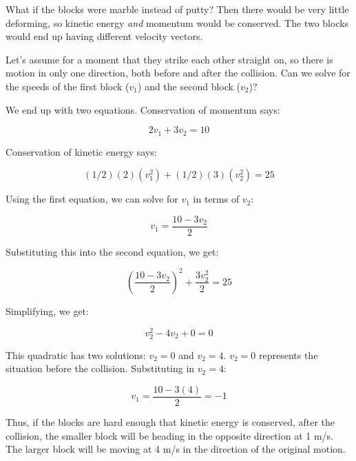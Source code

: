 What if the blocks were marble instead of putty?  Then there would be
very little deforming, so kinetic energy \emph{and} momentum would be
conserved. The two blocks would end up having different velocity
vectors.

Let's assume for a moment that they strike each other straight on, so
there is motion in only one direction, both before and after the
collision.  Can we solve for the speeds of the first block ($v_1$) and
the second block ($v_2$)?

We end up with two equations. Conservation of momentum says:

$$2 v_1 + 3 v_2 = 10$$

Conservation of kinetic energy says:

$$(1/2)(2)(v_1^2) + (1/2)(3)(v_2^2) = 25$$

Using the first equation, we can solve for $v_1$ in terms of $v_2$:

$$v_1 = \frac{10 - 3 v_2}{2}$$

Substituting this into the second equation, we get:

$$\left(\frac{10 - 3 v_2}{2}\right)^2 + \frac{3 v_2^2}{2} = 25$$

Simplifying, we get:

$$v_2^2 - 4 v_2 + 0 = 0$$

This quadratic has two solutions: $v_2 = 0$ and $v_2 = 4$.  $v_2 = 0$
represents the situation before the collision.  Substituting in $v_2 = 4$:

$$v_1 = \frac{10 - 3(4)}{2} = -1$$

Thus, if the blocks are hard enough that kinetic energy is conserved,
after the collision, the smaller block will be heading in the opposite
direction at 1 m/s.  The larger block will be moving at 4 m/s in the
direction of the original motion.

